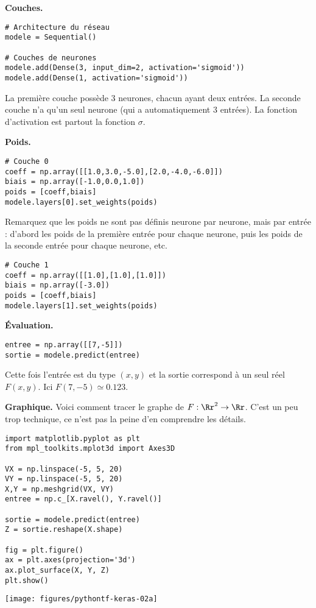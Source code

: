 \documentclass[11pt,class=report,crop=false]{standalone}
\begin{document}
\textbf{Couches.}
\begin{lstlisting}
# Architecture du réseau
modele = Sequential()

# Couches de neurones
modele.add(Dense(3, input_dim=2, activation='sigmoid'))
modele.add(Dense(1, activation='sigmoid'))
\end{lstlisting}

La première couche possède $3$ neurones, chacun ayant deux entrées.
La seconde couche n'a qu'un seul neurone (qui a automatiquement $3$ entrées). La fonction d'activation est partout la fonction $\sigma$.

\bigskip
\textbf{Poids.}


\begin{lstlisting}
# Couche 0
coeff = np.array([[1.0,3.0,-5.0],[2.0,-4.0,-6.0]])
biais = np.array([-1.0,0.0,1.0])
poids = [coeff,biais]
modele.layers[0].set_weights(poids)
\end{lstlisting}

Remarquez que les poids ne sont pas définis neurone par neurone, mais par entrée : d'abord les poids de la première entrée pour chaque neurone, puis les poids de la seconde entrée pour chaque neurone, etc.

\begin{lstlisting}
# Couche 1
coeff = np.array([[1.0],[1.0],[1.0]])
biais = np.array([-3.0])
poids = [coeff,biais]
modele.layers[1].set_weights(poids)
\end{lstlisting}

\bigskip
\textbf{Évaluation.}
\begin{lstlisting}
entree = np.array([[7,-5]])
sortie = modele.predict(entree)
\end{lstlisting}

Cette fois l'entrée est du type $(x,y)$ et la sortie correspond à un seul réel $F(x,y)$. Ici $F(7,-5) \simeq 0.123$.

\bigskip
\textbf{Graphique.}
Voici comment tracer le graphe de $F: \Rr^2 \to \Rr$. C'est un peu trop technique, ce n'est pas la peine d'en comprendre les détails.

\begin{minipage}{0.52\textwidth}
\begin{lstlisting}
import matplotlib.pyplot as plt
from mpl_toolkits.mplot3d import Axes3D

VX = np.linspace(-5, 5, 20)
VY = np.linspace(-5, 5, 20)
X,Y = np.meshgrid(VX, VY)
entree = np.c_[X.ravel(), Y.ravel()]

sortie = modele.predict(entree)
Z = sortie.reshape(X.shape)

fig = plt.figure()
ax = plt.axes(projection='3d')
ax.plot_surface(X, Y, Z)
plt.show()
\end{lstlisting}
\end{minipage}
\begin{minipage}{0.47\textwidth}
\begin{center}
\texttt{[image: figures/pythontf-keras-02a]}
\end{center}
\end{minipage}
\end{document}
